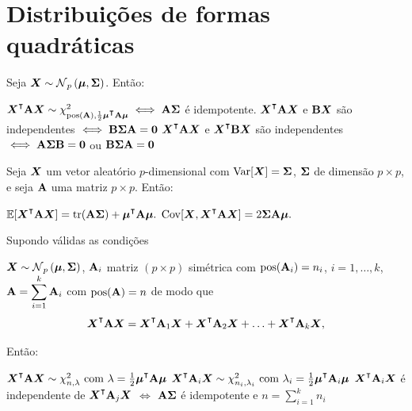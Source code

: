 \section{Distribuições de formas quadráticas}


\begin{theorem} 
	Seja $\v{X} \sim \normdist[p]{\v{\mu}, \m{\Sigma}}$. Então:
	\begin{outline}[enumerate]
		\1 \( \v{X}\T\m{A}\v{X} \sim \chidist{\pos(\m{A}), \frac{1}{2}\v{\mu}\T\m{A}\v{\mu}}
		\iff \m{A}\m{\Sigma} \) é idempotente.
		\1 $\v{X}\T\m{A}\v{X}$ e $\mathbf{B}\bm{X}$ são independentes \(\iff \mathbf{B}\mathbf{\Sigma}\mathbf{A} = \mathbf{0}\)
		\1 $\v{X}\T\m{A}\v{X}$ e $\v{X}\T\m{B}\v{X}$ são independentes \(\iff \mathbf{A}\mathbf{\Sigma}\mathbf{B} = \mathbf{0}\) ou \(\mathbf{B}\mathbf{\Sigma}\mathbf{A} = \mathbf{0} \)
	\end{outline}
\end{theorem}

\begin{theorem}
	Seja $\bm{X}$ um vetor aleatório $p$-dimensional com $\operatorname{Var}[\bm{X}] = \mathbf{\Sigma}$, $\mathbf{\Sigma}$ de dimensão $p\times p$, e seja $\mathbf{A}$ uma matriz $p\times p$. Então:
	\begin{outline}[enumerate]
		\1 \( \E[\v{X}\T\m{A}\v{X}] = \tr(\m{A}\m{\Sigma}) + \v{\mu}\T\m{A}\v{\mu}. \)
		\1 \( \Cov[\v{X}, \v{X}\T\m{A}\v{X}] = 2\m{\Sigma}\m{A}\v{\mu}. \)
	\end{outline}
\end{theorem}

\begin{theorem}
	Supondo válidas as condições
	\begin{outline}[enumerate]
		\1 $\v{X}\sim\normdist[p]{\v{\mu},\m{\Sigma}}$,
		\1 $\mathbf{A}_i$ matriz $(p\times p)$ simétrica com $\operatorname{pos}(\mathbf{A}_i) = n_i$, $i=1,\ldots,k$,
		\1 $\mathbf{A} = \displaystyle\sum_{i=1}^k \mathbf{A}_i$ com $\operatorname{pos}(\mathbf{A}) = n$ de modo que
		\begin{equation}
			\v{X}\T\m{A}\v{X} = \v{X}\T\m{A}_1\v{X} + \v{X}\T\m{A}_2\v{X} + \ldots + \v{X}\T\m{A}_k\v{X},
		\end{equation}
	\end{outline}
	Então:
	\begin{outline}[enumerate]
		\1 \( \v{X}\T\m{A}\v{X} \sim \chidist{n,\lambda} \text{ com } \lambda = \frac{1}{2}\v{\mu}\T\m{A}\v{\mu} \)
		\1 \( \v{X}\T\m{A}_i\v{X} \sim \chidist{n_i,\lambda_i} \text{ com } \lambda_i = \frac{1}{2}\v{\mu}\T\m{A}_i\v{\mu} \)
		\1 $\v{X}\T\m{A}_i\v{X}$ é independente de $\v{X}\T\m{A}_j\v{X}$ $\iff$ $\mathbf{A}\mathbf{\Sigma}$ é idempotente e $n = \sum_{i=1}^k n_i$
	\end{outline}
\end{theorem}

